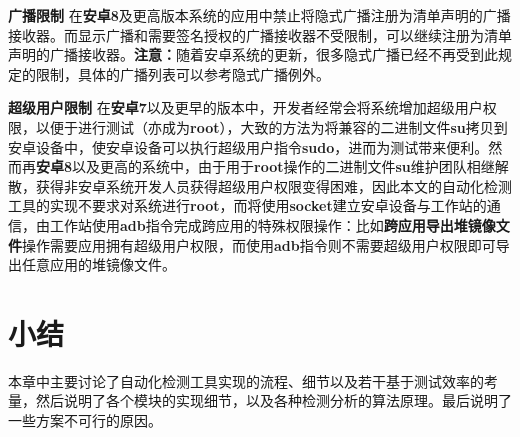 \textbf{广播限制 }\cite{android-receiver-limit} 在\textbf{安卓8}及更高版本系统的应用中禁止将隐式广播注册为清单声明的广播接收器。而显示广播和需要签名授权的广播接收器不受限制，可以继续注册为清单声明的广播接收器。\textbf{注意：}随着安卓系统的更新，很多隐式广播已经不再受到此规定的限制，具体的广播列表可以参考隐式广播例外\cite{android-receiver-limit-exception}。

\textbf{超级用户限制 } 在\textbf{安卓7}以及更早的版本中，开发者经常会将系统增加超级用户权限，以便于进行测试（亦成为\textbf{root}），大致的方法为将兼容的二进制文件\textbf{su}拷贝到安卓设备中，使安卓设备可以执行超级用户指令\textbf{sudo}，进而为测试带来便利。然而再\textbf{安卓8}以及更高的系统中，由于用于\textbf{root}操作的二进制文件\textbf{su}维护团队相继解散，获得非安卓系统开发人员获得超级用户权限变得困难，因此本文的自动化检测工具的实现不要求对系统进行\textbf{root}，而将使用\textbf{socket}建立安卓设备与工作站的通信，由工作站使用\textbf{adb}指令完成跨应用的特殊权限操作：比如\textbf{跨应用导出堆镜像文件}操作需要应用拥有超级用户权限，而使用\textbf{adb}指令则不需要超级用户权限即可导出任意应用的堆镜像文件。
\newline
\section{小结}
本章中主要讨论了自动化检测工具实现的流程、细节以及若干基于测试效率的考量，然后说明了各个模块的实现细节，以及各种检测分析的算法原理。最后说明了一些方案不可行的原因。